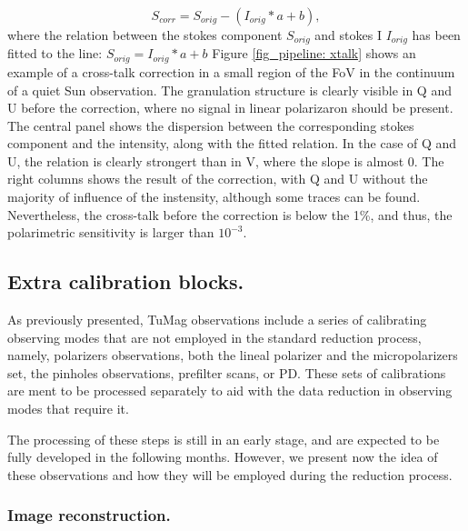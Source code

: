 \begin{equation}
  S_{corr} = S_{orig} - (I_{orig} * a + b),
\end{equation}
where the relation between the stokes component $S_{orig}$ and stokes I $I_{orig}$ has been fitted to the line: $S_{orig} =  I_{orig} * a + b$
Figure \ref{fig_pipeline: xtalk} shows an example of a cross-talk correction in a small region of the FoV in the continuum of a quiet Sun observation. The granulation structure is clearly visible in Q and U before the correction, where no signal in linear polarizaron should be present. The central panel shows the dispersion between the corresponding  stokes component and the intensity, along with the fitted relation. In the case of Q and U, the relation is clearly strongert than in V, where the slope is almost 0. The right columns shows the result of the correction, with Q and U without the majority of influence of the instensity, although some traces can be found. Nevertheless, the cross-talk before the correction is below the 1\%, and thus, the polarimetric sensitivity is larger than $10^{-3}$.


\subsection{Extra calibration blocks.}

As previously presented, TuMag observations include a series of calibrating observing modes that are not employed in the standard reduction process, namely, polarizers observations, both the lineal polarizer and the micropolarizers set, the pinholes observations, prefilter scans, or PD. These sets of calibrations are ment to be processed separately to aid with the data reduction in observing modes that require it.

The processing of these steps is still in an early stage, and are expected to be fully developed in the following months. However, we present now the idea of these observations and how they will be employed during the reduction process. 
\subsubsection{Image reconstruction.}

